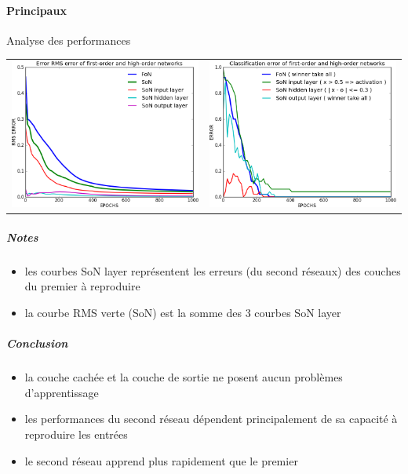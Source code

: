     \paragraph*{Principaux}
      Analyse des performances
      \begin{center}
	\begin{tabular}{lr}
	  \hspace*{-1cm}
	  \includegraphics[width=250px]{data/expA1/rms.png}
	  &
	  \includegraphics[width=250px]{data/expA1/err.png} 
	\end{tabular}
      \end{center}
      \subparagraph*{Notes}
	\begin{itemize}
	  \item les courbes SoN layer représentent les erreurs (du second réseaux) des couches du premier à reproduire 
	  \item la courbe RMS verte (SoN) est la somme des 3 courbes SoN layer
	\end{itemize}
      \subparagraph*{Conclusion}
	\begin{itemize}
	  \item la couche cachée et la couche de sortie ne posent aucun problèmes d'apprentissage
	  \item les performances du second réseau dépendent principalement de sa capacité à reproduire les entrées
	  \item le second réseau apprend plus rapidement que le premier
	\end{itemize}
